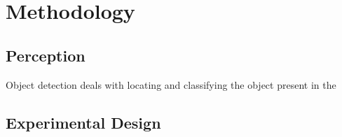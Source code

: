 

    \chapter{Methodology}

    \section{Perception}
    
    Object detection deals with locating and classifying the object present in the 

    \section{Experimental Design}

